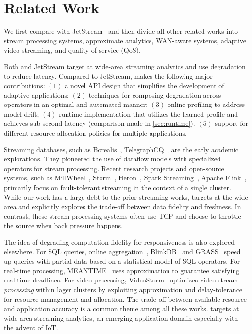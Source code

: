 \section{Related Work}
\label{sec:related-work}

We first compare \sysname{} with JetStream~\cite{rabkin2014aggregation} and then
divide all other related works into stream processing systems, approximate
analytics, WAN-aware systems, adaptive video streaming, and quality of service
(QoS). 

  Both \sysname{}
and JetStream target at wide-area streaming
analytics and use degradation to reduce latency. Compared to JetStream,
\sysname{} makes the following major contributions: $(1)$ a novel API design
that simplifies the development of adaptive applications; $(2)$ techniques for
composing degradation across operators in an optimal and automated manner; $(3)$
 online profiling to address model drift; $(4)$ runtime implementation
that
utilizes the learned profile and achieves sub-second latency (comparison made in
\autoref{sec:runtime}). $(5)$ support for different resource allocation policies
for multiple applications.

 Streaming databases, such as
Borealis~\cite{abadi2005design},
TelegraphCQ~\cite{chandrasekaran2003telegraphcq}, are the early academic
explorations. They pioneered the use of dataflow models with specialized
operators for stream processing. Recent research projects and open-source
systems, such as MillWheel~\cite{akidau2013millwheel},
Storm~\cite{toshniwal2014storm}, Heron~\cite{sanjeev2015twitter}, Spark
Streaming~\cite{zaharia2013discretized}, Apache Flink~\cite{carbone2015apache},
primarily focus on fault-tolerant streaming in the context of a single
cluster. While our work has a large debt to the prior streaming works,
\sysname{} targets at the wide area and explicitly explores the trade-off
between data fidelity and freshness. In contrast, these stream processing
systems often use TCP and choose to throttle the source when back pressure
happens.

 The idea of degrading computation fidelity for
responsiveness is also explored elsewhere. For SQL queries, online
aggregation~\cite{hellerstein1997online}, BlinkDB~\cite{agarwal2013blinkdb} and
GRASS~\cite{ananthanarayanan2014grass} speed up queries with partial data based
on a statistical model of SQL operators. For real-time processing,
MEANTIME~\cite{farrell2016meantime} uses approximation to guarantee satisfying
real-time deadlines. For video processing, VideoStorm~\cite{zhang2017live}
optimizes video stream \textit{processing} within lager clusters by exploiting
approximation and delay-tolerance for resource management and allocation. The
trade-off between available resource and application accuracy is a common theme
among all these works. \sysname{} targets at wide-area streaming analytics, an
emerging application domain especially with the advent of IoT\@.

